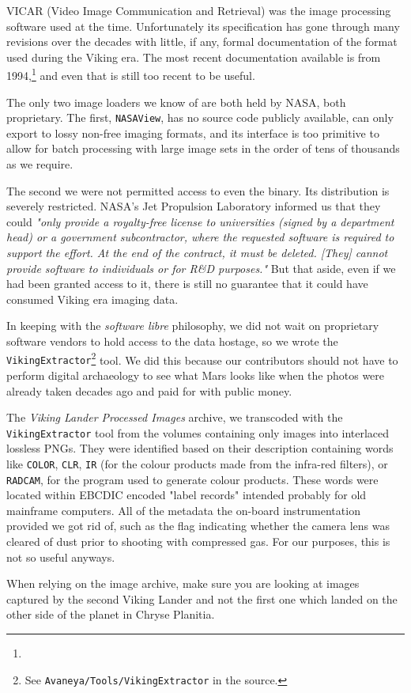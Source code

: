 VICAR (Video Image Communication and Retrieval) was the image processing software used at the time. Unfortunately its specification has gone through many revisions over the decades with little, if any, formal documentation of the format used during the Viking era. The most recent documentation available is from 1994,\footnote{} and even that is still too recent to be useful.

The only two image loaders we know of are both held by NASA, both proprietary. The first, {\tt NASAView}, has no source code publicly available, can only export to lossy non-free imaging formats, and its interface is too primitive to allow for batch processing with large image sets in the order of tens of thousands as we require. 

The second we were not permitted access to even the binary. Its distribution is severely restricted. NASA's Jet Propulsion Laboratory informed us that they could {\it "only provide a royalty-free license to universities (signed by a department head) or a government subcontractor, where the requested software is required to support the effort. At the end of the contract, it must be deleted. [They] cannot provide software to individuals or for R&D purposes."} But that aside, even if we had been granted access to it, there is still no guarantee that it could have consumed Viking era imaging data.

In keeping with the {\it software libre} philosophy, we did not wait on proprietary software vendors to hold access to the data hostage, so we wrote the {\tt VikingExtractor}\footnote{See {\tt Avaneya/Tools/VikingExtractor} in the source.} tool. We did this because our contributors should not have to perform digital archaeology to see what Mars looks like when the photos were already taken decades ago and paid for with public money.

The {\it Viking Lander Processed Images} archive, we transcoded with the {\tt VikingExtractor} tool from the volumes containing only images into interlaced lossless PNGs. They were identified based on their description containing words like {\tt COLOR}, {\tt CLR}, {\tt IR} (for the colour products made from the infra-red filters), or {\tt RADCAM}, for the program used to generate colour products. These words were located within EBCDIC encoded "label records" intended probably for old mainframe computers. All of the metadata the on-board instrumentation provided we got rid of, such as the flag indicating whether the camera lens was cleared of dust prior to shooting with compressed gas. For our purposes, this is not so useful anyways.

When relying on the image archive, make sure you are looking at images captured by the second Viking Lander and not the first one which landed on the other side of the planet in Chryse Planitia.

\StopChapter

